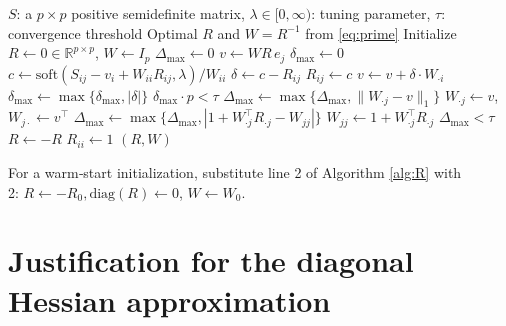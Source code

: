 \documentclass[12pt]{amsart}
\numberwithin{equation}{section}
\numberwithin{equation}{section}
\theoremstyle{plain}
\theoremstyle{definition}
\newcommand{\diag}[1]{\mathrm{diag}(#1)}
\newcommand{\R}{\mathbb{R}}
\begin{document}
\begin{algorithm}[H]
\caption{Coordinate Descent Algorithm for solving \eqref{eq:prime}; An adaptation of the glassoFast algorithm by \cite{glassoFAST}}\label{alg:R}
\begin{algorithmic}[1]
\Require $S$: a $p\times p$ positive semidefinite matrix, $\lambda\in[0,\infty)$: tuning parameter, $\tau$: convergence threshold
\Ensure Optimal $R$ and $W=R^{-1}$ from \eqref{eq:prime}
\State Initialize $R \gets 0\in\R^{p\times p}$, $W\gets I_p$ 
\Repeat
    \State $\Delta_{\max} \gets 0$
        \State $v \gets W R\, e_j$ 
        \Repeat
            \State $\delta_{\max} \gets 0$
                 
                    \State $c\gets\mathrm{soft}(S_{ij}-v_i+W_{ii} R_{ij}, \lambda)/W_{ii}$
                    \State $\delta\gets c-R_{ij}$
                        \State $R_{ij} \gets c$
                        \State $v\gets v+\delta\cdot W_{\cdot i}$
                        \State $\delta_{\max} \gets \max\{\delta_{\max}, |\delta|\}$
                    \EndIf
                \EndIf
            \EndFor
        \Until $\delta_{\max}\cdot p < \tau$ 
        \State $\Delta_{\max} \gets \max\{\Delta_{\max}, \|W_{\cdot j}-v\|_1\}$
        \State $W_{\cdot j}\gets v$, $W_{j \cdot}\gets v^\top$
        \State $\Delta_{\max} \gets \max\{\Delta_{\max}, |1+W_{\cdot j}^\top R_{\cdot j} - W_{jj}|\}$
        \State $W_{jj}\gets 1+W_{\cdot j}^\top R_{\cdot j}$ 
    \EndFor
\Until $\Delta_{\max} < \tau$ 
\State $R\gets -R$
    \State $R_{ii}\gets 1$
\EndFor
\State \Return $(R,W)$
\EndProcedure
\end{algorithmic}
\end{algorithm}
For a warm‑start initialization, substitute line 2 of Algorithm \ref{alg:R} with\\
2: $R \gets -R_0, \diag{R} \gets 0$, $W\gets W_0$.








\section{Justification for the diagonal Hessian approximation}\label{appendix_D_optim}
\end{document}
